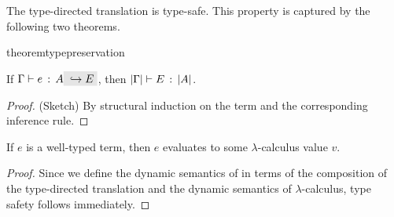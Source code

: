 The type-directed translation is type-safe. This property is captured
by the following two theorems.

\begin{restatable}{theorem}{typepreservation}
  \label{theorem:type-preservation}

  If $ \jtype \Gamma e A \yields E $,
  then $ \lvert \Gamma \rvert \vdash E \ \!:\! \ \lvert A \rvert $.
\end{restatable}

\begin{proof}
  (Sketch) By structural induction on the term and the corresponding
  inference rule.
\end{proof}

\begin{theorem}
  If $e$ is a well-typed \name term, then $e$ evaluates to some $\lambda$-calculus
  value $v$.
\end{theorem}

\begin{proof}
  Since we define the dynamic semantics of \name in terms of the composition of
  the type-directed translation and the dynamic semantics of $\lambda$-calculus, type safety follows immediately.
\end{proof}

